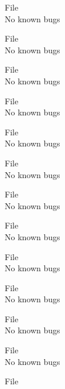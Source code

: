 \begin{DoxyRefList}
\item[File \doxylink{NutAngles_8h}{Nut\+Angles.h} ]\hfill \\
\label{bug__bug000024}%
%
No known bugs  
\item[File \doxylink{NutMatrix_8cpp}{Nut\+Matrix.cpp} ]\hfill \\
\label{bug__bug000061}%
%
No known bugs  
\item[File \doxylink{NutMatrix_8h}{Nut\+Matrix.h} ]\hfill \\
\label{bug__bug000025}%
%
No known bugs  
\item[File \doxylink{PoleMatrix_8cpp}{Pole\+Matrix.cpp} ]\hfill \\
\label{bug__bug000062}%
%
No known bugs  
\item[File \doxylink{PoleMatrix_8h}{Pole\+Matrix.h} ]\hfill \\
\label{bug__bug000026}%
%
No known bugs  
\item[File \doxylink{Position_8cpp}{Position.cpp} ]\hfill \\
\label{bug__bug000063}%
%
No known bugs  
\item[File \doxylink{Position_8h}{Position.h} ]\hfill \\
\label{bug__bug000027}%
%
No known bugs  
\item[File \doxylink{PrecMatrix_8cpp}{Prec\+Matrix.cpp} ]\hfill \\
\label{bug__bug000064}%
%
No known bugs  
\item[File \doxylink{PrecMatrix_8h}{Prec\+Matrix.h} ]\hfill \\
\label{bug__bug000028}%
%
No known bugs  
\item[File \doxylink{R__x_8cpp}{R\+\_\+x.cpp} ]\hfill \\
\label{bug__bug000065}%
%
No known bugs  
\item[File \doxylink{R__x_8h}{R\+\_\+x.h} ]\hfill \\
\label{bug__bug000029}%
%
No known bugs  
\item[File \doxylink{R__y_8cpp}{R\+\_\+y.cpp} ]\hfill \\
\label{bug__bug000066}%
%
No known bugs  
\item[File \doxylink{R__y_8h}{R\+\_\+y.h} ]\hfill \\

\end{DoxyRefList}
